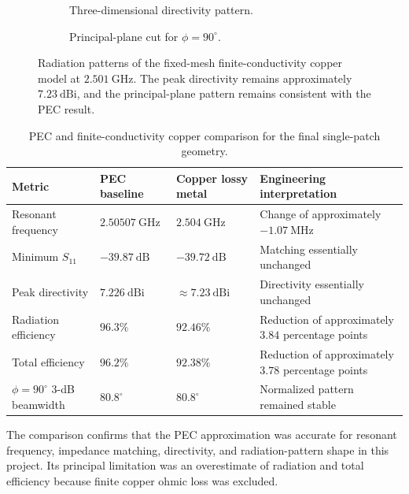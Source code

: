 \begin{figure}[H]
    \centering
    \begin{subfigure}[t]{0.47\textwidth}
        \centering
        \caption{Three-dimensional directivity pattern.}
        \label{fig:single-patch-copper-3d}
    \end{subfigure}
    \hfill
    \begin{subfigure}[t]{0.51\textwidth}
        \centering
        \caption{Principal-plane cut for \(\phi=90^\circ\).}
        \label{fig:single-patch-copper-phi90}
    \end{subfigure}
    \caption[Finite-conductivity single-patch radiation patterns.]{Radiation patterns of the fixed-mesh finite-conductivity copper model at \(2.501~\mathrm{GHz}\). The peak directivity remains approximately \(7.23~\mathrm{dBi}\), and the principal-plane pattern remains consistent with the PEC result.}
    \label{fig:single-patch-copper-patterns}
\end{figure}

\begin{table}[H]
\centering
\caption{PEC and finite-conductivity copper comparison for the final single-patch geometry.}
\label{tab:single-patch-conductor-comparison}
\small
\setlength{\tabcolsep}{4pt}
\renewcommand{\arraystretch}{1.18}
\begin{tabularx}{\textwidth}{@{}
>{\raggedright\arraybackslash}X
>{\centering\arraybackslash}p{}
>{\centering\arraybackslash}p{}
>{\raggedright\arraybackslash}p{}
@{}}
\toprule
\textbf{Metric} & \textbf{PEC baseline} & \textbf{Copper lossy metal} & \textbf{Engineering interpretation} \\
\midrule
Resonant frequency & \(2.50507~\mathrm{GHz}\) & \(2.504~\mathrm{GHz}\) & Change of approximately \(-1.07~\mathrm{MHz}\) \\
Minimum \(S_{11}\) & \(-39.87~\mathrm{dB}\) & \(-39.72~\mathrm{dB}\) & Matching essentially unchanged \\
Peak directivity & \(7.226~\mathrm{dBi}\) & \(\approx7.23~\mathrm{dBi}\) & Directivity essentially unchanged \\
Radiation efficiency & \(96.3\%\) & \(92.46\%\) & Reduction of approximately \(3.84\) percentage points \\
Total efficiency & \(96.2\%\) & \(92.38\%\) & Reduction of approximately \(3.78\) percentage points \\
\(\phi=90^\circ\) 3-dB beamwidth & \(80.8^\circ\) & \(80.8^\circ\) & Normalized pattern remained stable \\
\bottomrule
\end{tabularx}
\end{table}

The comparison confirms that the PEC approximation was accurate for resonant frequency, impedance
matching, directivity, and radiation-pattern shape in this project. Its principal limitation was an
overestimate of radiation and total efficiency because finite copper ohmic loss was excluded.
